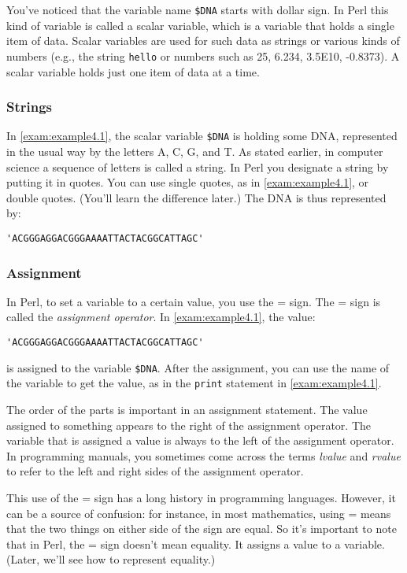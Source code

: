 You've noticed that the variable name \verb|$DNA| starts with dollar sign. In Perl this kind of variable is called a scalar variable, which is a variable that holds a single item of data. Scalar variables are used for such data as strings or various kinds of numbers (e.g., the string \verb|hello| or numbers such as 25, 6.234, 3.5E10, -0.8373). A scalar variable holds just one item of data at a time. 

\subsubsection{Strings}
In \autoref{exam:example4.1}, the scalar variable \verb|$DNA| is holding some DNA, represented in the usual way by the letters A, C, G, and T. As stated earlier, in computer science a sequence of letters is called a string. In Perl you designate a string by putting it in quotes. You can use single quotes, as in \autoref{exam:example4.1}, or double quotes. (You'll learn the difference later.) The DNA is thus represented by:

\begin{lstlisting}
'ACGGGAGGACGGGAAAATTACTACGGCATTAGC'
\end{lstlisting}

\subsubsection{Assignment}
In Perl, to set a variable to a certain value, you use the = sign. The = sign is called the \textit{assignment operator}. In \autoref{exam:example4.1}, the value: 

\begin{lstlisting}
'ACGGGAGGACGGGAAAATTACTACGGCATTAGC' 
\end{lstlisting}

is assigned to the variable \verb|$DNA|. After the assignment, you can use the name of the variable to get the value, as in the \verb|print| statement in \autoref{exam:example4.1}.  

The order of the parts is important in an assignment statement. The value assigned to something appears to the right of the assignment operator. The variable that is assigned a value is always to the left of the assignment operator. In programming manuals, you sometimes come across the terms \textit{lvalue} and \textit{rvalue} to refer to the left and right sides of the assignment operator.

This use of the = sign has a long history in programming languages. However, it can be a source of confusion: for instance, in most mathematics, using = means that the two things on either side of the sign are equal. So it's important to note that in Perl, the = sign doesn't mean equality. It assigns a value to a variable. (Later, we'll see how to represent equality.)

